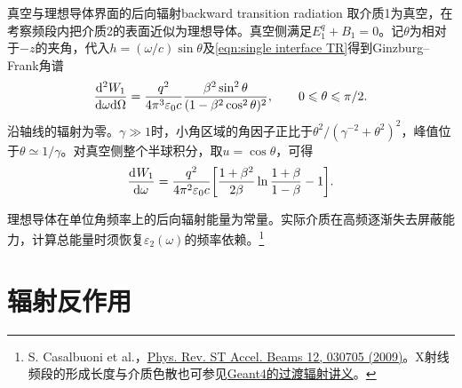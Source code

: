 \begin{example}{真空与理想导体界面的后向辐射}{backward transition radiation}
    取介质1为真空，在考察频段内把介质2的表面近似为理想导体。真空侧满足$E_1^q + B_1 = 0$。记$\theta$为相对于$-z$的夹角，代入$h = (\omega/c)\sin\theta$及\eqref{eqn:single interface TR}得到Ginzburg--Frank角谱
    \begin{equation}
        \label{eq:ed-ginzburg-frank-angular}
        \frac{\mathop{}\!\mathrm{d}^2 W_1}{\mathrm{d}\omega\mathrm{d}\Omega}
        = \frac{q^2}{4\pi^3\varepsilon_0c}
          \frac{\beta^2\sin^2\theta}{(1 - \beta^2\cos^2\theta)^2},
        \qquad 0 \leqslant \theta \leqslant \pi/2 .
    \end{equation}
    沿轴线的辐射为零。$\gamma \gg 1$时，小角区域的角因子正比于$\theta^2/(\gamma^{-2} + \theta^2)^2$，峰值位于$\theta \simeq 1/\gamma$。对真空侧整个半球积分，取$u = \cos\theta$，可得
    \begin{equation}
        \label{eq:ed-ginzburg-frank-spectrum}
        \frac{\mathop{}\!\mathrm{d}^{}W_1}{\mathrm{d}{\omega}^{}} = \frac{q^2}{4\pi^2\varepsilon_0c}
        \biggl[\frac{1 + \beta^2}{2\beta}\ln\frac{1 + \beta}{1 - \beta} - 1\biggr].
    \end{equation}
\end{example}

理想导体在单位角频率上的后向辐射能量为常量。实际介质在高频逐渐失去屏蔽能力，计算总能量时须恢复$\varepsilon_2(\omega)$的频率依赖。\footnote{S. Casalbuoni et al.，\href{https://doi.org/10.1103/PhysRevSTAB.12.030705}{Phys. Rev. ST Accel. Beams 12, 030705 (2009)}。X射线频段的形成长度与介质色散也可参见\href{https://geant4.web.cern.ch/documentation/dev/prm_html/PhysicsReferenceManual/electromagnetic/xray_production/xtr.html}{Geant4的过渡辐射讲义}。}

\section{辐射反作用}

